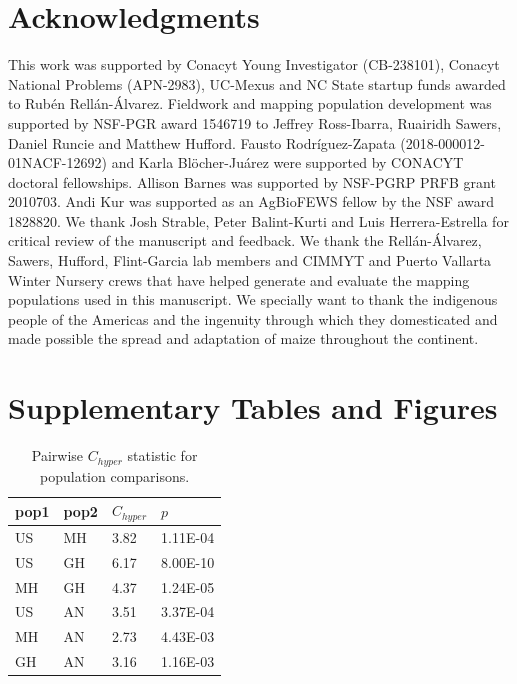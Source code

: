 \documentclass[9pt,twocolumn,twoside,lineno]{BioRxiv}
\begin{document}
\section{Acknowledgments}
This work was supported by Conacyt Young Investigator (CB-238101), Conacyt National Problems (APN-2983), UC-Mexus and NC State startup funds awarded to Rubén Rellán-Álvarez. 
Fieldwork and mapping population development was supported by NSF-PGR award 1546719 to Jeffrey Ross-Ibarra, Ruairidh Sawers, Daniel Runcie and Matthew Hufford.  
Fausto Rodríguez-Zapata (2018-000012-01NACF-12692) and Karla Blöcher-Juárez were supported by CONACYT doctoral fellowships.
Allison Barnes was supported by NSF-PGRP PRFB grant 2010703. 
Andi Kur was supported as an AgBioFEWS fellow by the NSF award 1828820.
We thank Josh Strable, Peter Balint-Kurti and Luis Herrera-Estrella for critical review of the manuscript and feedback. 
We thank the Rellán-Álvarez, Sawers, Hufford, Flint-Garcia lab members and CIMMYT and Puerto Vallarta Winter Nursery crews that have helped generate and evaluate the mapping populations used in this manuscript.
We specially want to thank the indigenous people of the Americas and the  ingenuity through which they domesticated and made possible the spread and adaptation of maize throughout the continent. 
\label{sec:acknowledgments}



\clearpage

\onecolumn

\section*{Supplementary Tables and Figures}

\begin{table}[h!]

\begin{tabular}{@{}llll@{}}
\toprule
pop1 & pop2 & $C_{hyper}$   & $p$  \\ \midrule
US   & MH   & 3.82 & 1.11E-04 \\
US   & GH   & 6.17 & 8.00E-10 \\
MH   & GH   & 4.37 & 1.24E-05 \\
US   & AN   & 3.51 & 3.37E-04 \\
MH   & AN   & 2.73 & 4.43E-03 \\
GH   & AN   & 3.16 & 1.16E-03 \\ \bottomrule
\end{tabular}
\label{tab:table1}
\caption{Pairwise $C_{hyper}$ statistic for population comparisons.}
\end{table}
\end{document}
